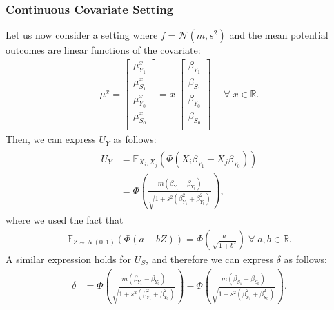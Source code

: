 \documentclass[12pt]{article}
\newcommand{\E}{\mathbb{E}}
\begin{document}
\subsubsection{Continuous Covariate Setting}
\label{subsec:continuous_covariate_setting}

Let us now consider a setting where \(f = \mathcal{N}(m,s^2)\) and the mean potential outcomes are linear functions of the covariate:
\begin{align}
    \mu^{x} = \begin{bmatrix}
      \mu^{x}_{Y_{1}} \\
      \mu^{x}_{S_{1}} \\
      \mu^{x}_{Y_{0}} \\
      \mu^{x}_{S_{0}} \\
    \end{bmatrix}
    = x \; \begin{bmatrix}
      \beta_{Y_{1}} \\
      \beta_{S_{1}} \\
      \beta_{Y_{0}} \\
      \beta_{S_{0}} \\
    \end{bmatrix} \; \quad \forall \; x \in \mathbb{R}.
\end{align}
Then, we can express \(U_Y\) as follows:
\begin{align}
  \begin{split}
    U_{Y} & = \E_{X_{i}, X_{j}} \left( \Phi \left( X_{i} \beta_{Y_{1}} - X_{j} \beta_{Y_{0}} \right) \right) \\
    & = \Phi \left( \frac{m (\beta_{Y_{1}} - \beta_{Y_{0}})}{\sqrt{1 + s^2 (\beta_{Y_{1}}^2 + \beta_{Y_{0}}^2)}} \right),
  \end{split}
\end{align}
where we used the fact that
\begin{align}
  \E_{Z \sim \mathcal{N}(0,1)} \left( \Phi(a + b Z) \right) = \Phi \left( \frac{a}{\sqrt{1 + b^2}} \right) \; \forall \; a,b \in \mathbb{R}.
\end{align}
A similar expression holds for \(U_{S}\), and therefore we can express \(\delta\) as follows:
\begin{align}
  \delta & = \Phi \left( \frac{m (\beta_{Y_{1}} - \beta_{Y_{0}})}{\sqrt{1 + s^2 (\beta_{Y_{1}}^2 + \beta_{Y_{0}}^2)}} \right) - \Phi \left( \frac{m (\beta_{S_{1}} - \beta_{S_{0}})}{\sqrt{1 + s^2 (\beta_{S_{1}}^2 + \beta_{S_{0}}^2)}} \right).
\end{align}
\end{document}
